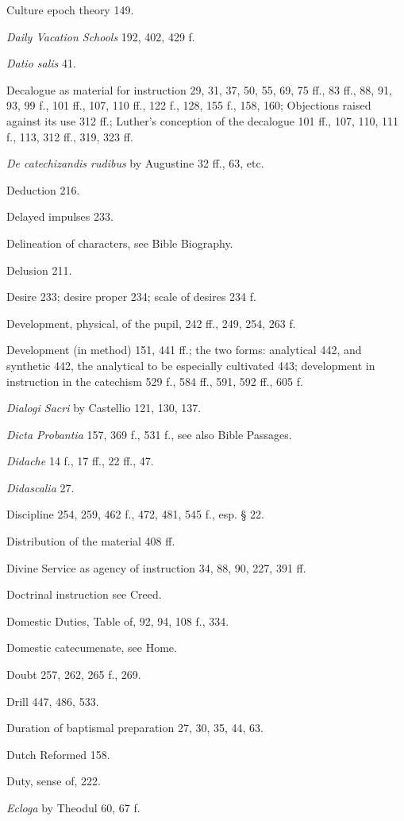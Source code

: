 Culture epoch theory 149.

\emph{Daily Vacation Schools} 192, 402, 429 f.

\emph{Datio salis} 41.

Decalogue as material for instruction 29, 31, 37, 50, 55, 69, 75 ff., 83 ff., 88, 91, 93, 99 f., 101 ff., 107, 110 ff., 122 f., 128, 155 f., 158, 160; Objections raised against its use 312 ff.; Luther’s conception of the decalogue 101 ff., 107, 110, 111 f., 113, 312 ff., 319, 323 ff.

\emph{De catechizandis rudibus} by Augustine 32 ff., 63, etc.

Deduction 216.

Delayed impulses 233.

Delineation of characters, see Bible Biography.

Delusion 211.

Desire 233; desire proper 234; scale of desires 234 f.

Development, physical, of the pupil, 242 ff., 249, 254, 263 f.

Development (in method) 151, 441 ff.; the two forms: analytical 442, and synthetic 442, the analytical to be especially cultivated 443; development in instruction in the catechism 529 f., 584 ff., 591, 592 ff., 605 f.

\emph{Dialogi Sacri} by Castellio 121, 130, 137.

\emph{Dicta Probantia} 157, 369 f., 531 f., see also Bible Passages.

\emph{Didache} 14 f., 17 ff., 22 ff., 47.

\emph{Didascalia} 27.

Discipline 254, 259, 462 f., 472, 481, 545 f., esp. § 22.

Distribution of the material 408 ff.

Divine Service as agency of instruction 34, 88, 90, 227, 391 ff.

Doctrinal instruction see Creed.

Domestic Duties, Table of, 92, 94, 108 f., 334.

Domestic catecumenate, see Home.

Doubt 257, 262, 265 f., 269.

Drill 447, 486, 533.

Duration of baptismal preparation 27, 30, 35, 44, 63.

Dutch Reformed 158.

Duty, sense of, 222.

\emph{\emph{Ecloga}} by Theodul 60, 67 f.


